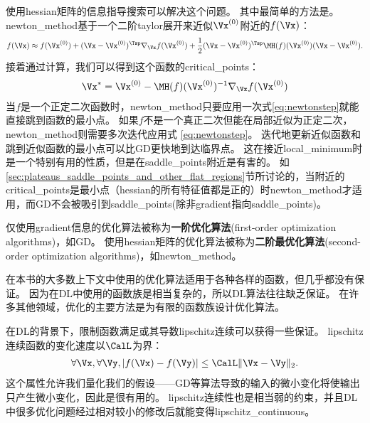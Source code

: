 
使用\gls{hessian}矩阵的信息指导搜索可以解决这个问题。
其中最简单的方法是。
\gls{newton_method}基于一个二阶\gls{taylor}展开来近似$\Vx^{(0)}$附近的$f(\Vx)$：
\begin{align}
 f(\Vx) \approx f(\Vx^{(0)}) + (\Vx - \Vx^{(0)})^\Tsp \nabla_{\Vx} f(\Vx^{(0)}) + 
 \frac{1}{2}  (\Vx - \Vx^{(0)})^\Tsp \MH(f)(\Vx^{(0)})  (\Vx - \Vx^{(0)}).
\end{align}
接着通过计算，我们可以得到这个函数的\gls{critical_points}：
\begin{align} \label{eq:newtonstep}
 \Vx^* =  \Vx^{(0)} -  \MH(f)(\Vx^{(0)})^{-1}  \nabla_{\Vx} f(\Vx^{(0)})
\end{align}
当$f$是一个正定二次函数时，\gls{newton_method}只要应用一次式\ref{eq:newtonstep}就能直接跳到函数的最小点。
如果$f$不是一个真正二次但能在局部近似为正定二次，\gls{newton_method}则需要多次迭代应用式 \ref{eq:newtonstep}。
迭代地更新近似函数和跳到近似函数的最小点可以比\gls{GD}更快地到达临界点。
这在接近\gls{local_minimum}时是一个特别有用的性质，但是在\gls{saddle_points}附近是有害的。
如\ref{sec:plateaus_saddle_points_and_other_flat_regions}节所讨论的，当附近的\gls{critical_points}是最小点（\gls{hessian}的所有特征值都是正的）时\gls{newton_method}才适用，而\gls{GD}不会被吸引到\gls{saddle_points}(除非\gls{gradient}指向\gls{saddle_points})。

仅使用\gls{gradient}信息的优化算法被称为\textbf{一阶优化算法}(first-order optimization algorithms)，如\gls{GD}。
使用\gls{hessian}矩阵的优化算法被称为\textbf{二阶最优化算法}(second-order optimization algorithms)\citep{NumOptBook}，如\gls{newton_method}。

在本书的大多数上下文中使用的优化算法适用于各种各样的函数，但几乎都没有保证。
因为在\gls{DL}中使用的函数族是相当复杂的，所以\gls{DL}算法往往缺乏保证。
在许多其他领域，优化的主要方法是为有限的函数族设计优化算法。

在\gls{DL}的背景下，限制函数满足或其导数\gls{lipschitz}连续可以获得一些保证。
\gls{lipschitz}连续函数的变化速度以$\CalL$为界：
\begin{align}
 \forall \Vx, \forall \Vy, | f(\Vx) - f(\Vy)|  \leq \CalL \| \Vx - \Vy \|_2 .
\end{align}
这个属性允许我们量化我们的假设——\gls{GD}等算法导致的输入的微小变化将使输出只产生微小变化，因此是很有用的。
\gls{lipschitz}连续性也是相当弱的约束，并且\gls{DL}中很多优化问题经过相对较小的修改后就能变得\gls{lipschitz_continuous}。

